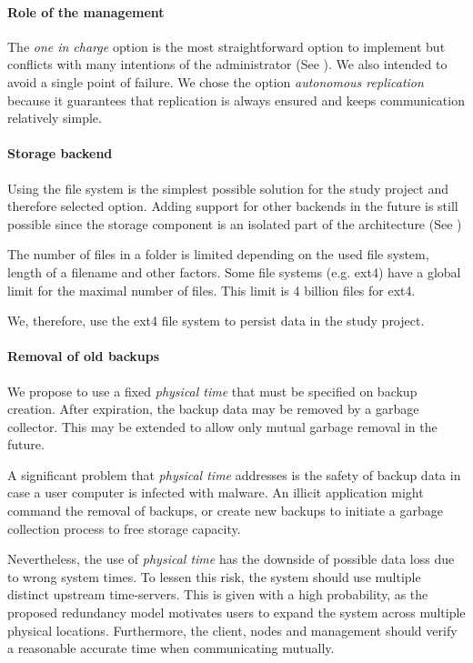 \paragraph{Role of the management}
The \emph{one in charge} option is the most straightforward option to implement but conflicts with many intentions of the administrator (See ). We also intended to avoid a single point of failure. We chose the option \emph{autonomous replication} because it guarantees that replication is always ensured and keeps communication relatively simple.

\paragraph{Storage backend}
Using the file system is the simplest possible solution for the study project and therefore selected option. Adding support for other backends in the future is still possible since the storage component is an isolated part of the architecture (See )

The number of files in a folder is limited depending on the used file system, length of a filename and other factors. Some file systems (e.g. ext4) have a global limit for the maximal number of files. This limit is 4 billion files for ext4. \cite{ext4}

We, therefore, use the ext4 file system to persist data in the study project.

\paragraph{Removal of old backups}
We propose to use a fixed \emph{physical time} that must be specified on backup creation. After expiration, the backup data may be removed by a garbage collector. This may be extended to allow only mutual garbage removal in the future.

A significant problem that \emph{physical time} addresses is the safety of backup data in case a user computer is infected with malware. An illicit application might command the removal of backups, or create new backups to initiate a garbage collection process to free storage capacity.

Nevertheless, the use of \emph{physical time} has the downside of possible data loss due to wrong system times. To lessen this risk, the system should use multiple distinct upstream time-servers. This is given with a high probability, as the proposed redundancy model motivates users to expand the system across multiple physical locations. Furthermore, the client, nodes and management should verify a reasonable accurate time when communicating mutually.

